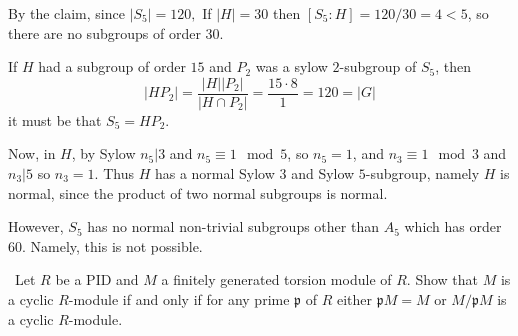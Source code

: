 \documentclass[12pt]{Qual}
\begin{document}
\begin{solution}
By the claim, since $|S_5|=120,$ If $|H|=30$ then $[S_5:H]=120/30=4<5$, so there are no subgroups of order $30$.

If $H$ had a subgroup of order $15$ and $P_2$ was a sylow $2$-subgroup of $S_5$, then $$|HP_2|=\frac{|H||P_2|}{|H\cap P_2|}=\frac{15\cdot 8}{1}=120=|G|$$ it must be that $S_5=HP_2$.

Now, in $H$, by Sylow $n_5|3$ and $n_5\equiv 1\mod 5$, so $n_5=1$, and $n_3\equiv 1\mod 3$ and $n_3|5$ so $n_3=1.$ Thus $H$ has a normal Sylow $3$ and Sylow $5$-subgroup, namely $H$ is normal, since the product of two normal subgroups is normal.

However, $S_5$ has no normal non-trivial subgroups other than $A_5$ which has order $60$. Namely, this is not possible.
\end{solution}
\newpage


\begin{problem} $\,$
Let $R$ be a PID and $M$ a finitely generated torsion module of $R.$ Show that $M$ is a cyclic $R$-module if and only if for any prime $\mathfrak{p}$ of $R$ either $\mathfrak{p}M=M$ or $M/\mathfrak{p}M$ is a cyclic $R$-module.
\end{problem}
\end{document}
